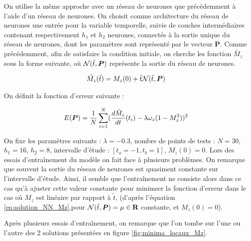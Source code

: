 \documentclass[12pt]{report}
\begin{document}
On utilise la même approche avec un réseau de neurones que précédemment à l'aide d'un réseau de neurones.
On choisit comme architecture du réseau de neurones une entrée pour la variable temporelle, suivie de couches intermédiaires contenant respectivement $h_1$ et $h_2$ neurones, connectés à la sortie unique du réseau de neurones, dont les paramètres sont représenté par le vecteur $\bm{P}$.
Comme précédemment, afin de satisfaire la condition initiale, on cherche les fonction $\tilde{M_z}$ sous la forme suivante, où ${\mathcal{N}}(\Tilde{t},\bm{P})$ représente la sortie du réseau de neurones.

\begin{equation}
    \Tilde{M_z}(\Tilde{t}) = M_z(0) +\Tilde{t} {\mathcal{N}}(\Tilde{t},\bm{P})
    \label{eq:solution_NN_Mz}
\end{equation}

On définit la fonction d'erreur suivante :

\begin{equation}
    E(\bm{P}) = \frac{1}{N} \sum_{i=1}^{N} (\frac{d\Tilde{M}_z}{dt}(t_i) - \lambda\omega_z (1-M_z^2) )^2
\label{eq:erreur_Mz}
\end{equation}

On fixe les paramètres suivants : $\lambda = -0.3$, nombre de points de tests : $N=30$, $h_1 = 16$, $h_2 = 8$, intervalle d'étude : $[t_a = -1, t_b = 1]$, $M_z(0) = 0$.
Lors des essais d'entraînement du modèle on fait face à plusieurs problèmes.
On remarque que souvent la sortie du réseau de neurones est quasiment constante sur l'intervalle d'étude.
Ainsi, il semble que l'entraînement ne consiste alors dans ce cas qu'à ajuster cette valeur constante pour minimser la fonction d'erreur dans le cas où $M_z$ est linéaire par rapport à $\tilde{t}$, (d'après l'équation \ref{eq:solution_NN_Mz},pour ${\mathcal{N}}(\Tilde{t},\bm{P}) = \mu\in \mathbf{R}$ constante, et $M_z(0) = 0$).

Après plusieurs essais d'entraînement, on remarque que l'on tombe sur l'une ou l'autre des 2 solutions présentées en figure \ref{fig:minima_locaux_Mz}.
\end{document}

